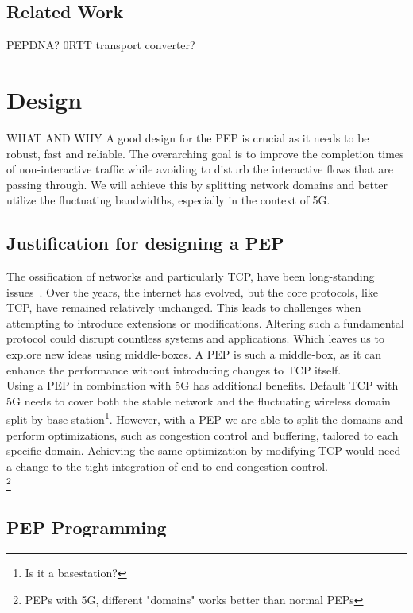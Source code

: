 \documentclass[a4paper,english, 11pt]{report}
\begin{document}
\section{Related Work}
PEPDNA? 0RTT transport converter?

\chapter{Design} WHAT AND WHY
A good design for the PEP is crucial as it needs to be robust, fast and reliable. The overarching goal is to improve the completion times of non-interactive traffic while avoiding to disturb the interactive flows that are passing through. We will achieve this by splitting network domains and better utilize the fluctuating bandwidths, especially in the context of 5G. 

\section{Justification for designing a PEP}

The ossification of networks and particularly TCP, have been long-standing issues~\cite{tcp_extendable}. Over the years, the internet has evolved, but the core protocols, like TCP, have remained relatively unchanged. This leads to challenges when attempting to introduce extensions or modifications. Altering such a fundamental protocol could disrupt countless systems and applications. Which leaves us to explore new ideas using middle-boxes. A PEP is such a middle-box, as it can enhance the performance without introducing changes to TCP itself.\\

Using a PEP in combination with 5G has additional benefits. Default TCP with 5G needs to cover both the stable network and the fluctuating wireless domain split by base station\footnote{Is it a basestation?}. However, with a PEP we are able to split the domains and perform optimizations, such as congestion control and buffering, tailored to each specific domain. Achieving the same optimization by modifying TCP would need a change to the tight integration of end to end congestion control.\\ \footnote{PEPs with 5G, different "domains" works better than normal PEPs}


\section{PEP Programming}
\end{document}
